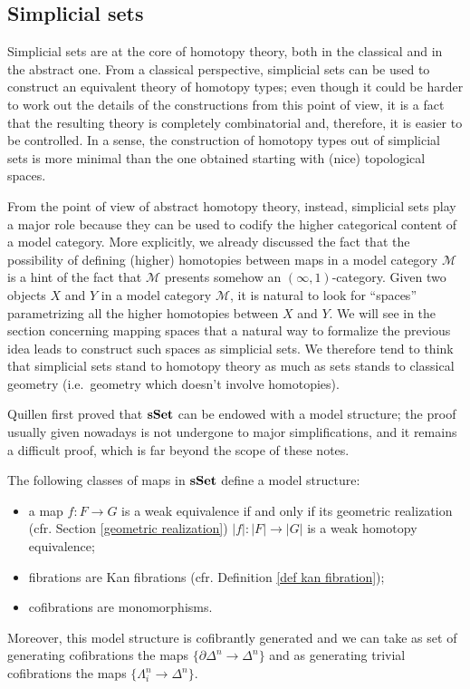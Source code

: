 \begin{refsection}
\subsection{Simplicial sets}

Simplicial sets are at the core of homotopy theory, both in the classical and in the abstract one. From a classical perspective, simplicial sets can be used to construct an equivalent theory of homotopy types; even though it could be harder to work out the details of the constructions from this point of view, it is a fact that the resulting theory is completely combinatorial and, therefore, it is easier to be controlled. In a sense, the construction of homotopy types out of simplicial sets is more minimal than the one obtained starting with (nice) topological spaces.

From the point of view of abstract homotopy theory, instead, simplicial sets play a major role because they can be used to codify the higher categorical content of a model category. More explicitly, we already discussed the fact that the possibility of defining (higher) homotopies between maps in a model category $\mathcal M$ is a hint of the fact that $\mathcal M$ presents somehow an $(\infty,1)$-category. Given two objects $X$ and $Y$ in a model category $\mathcal M$, it is natural to look for ``spaces'' parametrizing all the higher homotopies between $X$ and $Y$. We will see in the section concerning mapping spaces that a natural way to formalize the previous idea leads to construct such spaces as simplicial sets. We therefore tend to think that simplicial sets stand to homotopy theory as much as sets stands to classical geometry (i.e.\ geometry which doesn't involve homotopies).

Quillen first proved that $\mathbf{s\,\!\mathbf{Set}}$ can be endowed with a model structure; the proof usually given nowadays is not undergone to major simplifications, and it remains a difficult proof, which is far beyond the scope of these notes.

\begin{thm} \label{thm model structure on sset}
The following classes of maps in $\mathbf{s\,\!\mathbf{Set}}$ define a model structure:
\begin{itemize}
\item a map $f \colon F \to G$ is a weak equivalence if and only if its geometric realization (cfr. Section \ref{geometric realization}) $|f| \colon |F| \to |G|$ is a weak homotopy equivalence;
\item fibrations are Kan fibrations (cfr. Definition \ref{def kan fibration});
\item cofibrations are monomorphisms.
\end{itemize}
Moreover, this model structure is cofibrantly generated and we can take as set of generating cofibrations the maps $\{\partial \Delta^n \to \Delta^n\}$ and as generating trivial cofibrations the maps $\{\Lambda^n_i \to \Delta^n\}$.
\end{thm}


\end{refsection}
